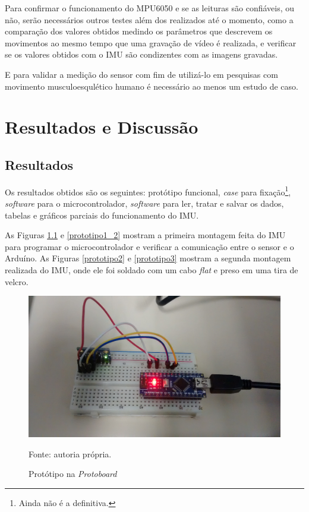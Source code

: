 	Para confirmar o funcionamento do MPU6050  e se as leituras são confiáveis, ou não, serão necessários outros testes além dos realizados até o momento, como a comparação dos valores obtidos medindo os parâmetros que descrevem os movimentos ao mesmo tempo que uma gravação de vídeo é realizada, e verificar se os valores obtidos com o IMU são condizentes com as imagens gravadas. 
	
	E para validar a medição do sensor com fim de  utilizá-lo em pesquisas com movimento musculoesqulético humano é necessário ao menos um estudo de caso.
	
\chapter{Resultados e Discussão}
	\section{Resultados}
	
	
	Os resultados obtidos são os seguintes: protótipo funcional, \textit{case} para fixação\footnote{Ainda não é a definitiva.}, \textit{software} para o microcontrolador, \textit{software} para ler, tratar e salvar os dados, tabelas e gráficos parciais do funcionamento do IMU.
	
	As Figuras \ref{prototipo1} e \ref{prototipo1_2} mostram a primeira montagem feita do IMU para programar o microcontrolador e verificar a comunicação entre o sensor e o Arduíno. As Figuras \ref{prototipo2} e \ref{prototipo3} mostram a segunda montagem realizada do IMU, onde ele foi soldado com um cabo \textit{flat} e preso em uma tira de velcro.
	
	\begin{figure}[h]
		\centering
		\includegraphics[keepaspectratio=true,scale=0.15]{figuras/prototipo1.jpg}
		\caption{Protótipo na \textit{Protoboard}}
		Fonte: autoria própria. 
		\label{prototipo1}	
	\end{figure}
	 
